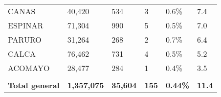 \begin{tabular}{llllll}
	\cellcolor[HTML]{FFFFC7}CANAS         & 40,420             & 534                        & 3                    & 0.6\%                      & 7.4                                                                                   \\
	\cellcolor[HTML]{FFFFC7}ESPINAR       & 71,304             & 990                        & 5                    & 0.5\%                      & 7.0                                                                                   \\
	\cellcolor[HTML]{FFFFC7}PARURO        & 31,264             & 268                        & 2                    & 0.7\%                      & 6.4                                                                                   \\
	\cellcolor[HTML]{FFFFC7}CALCA         & 76,462             & 731                        & 4                    & 0.5\%                      & 5.2                                                                                   \\
	\cellcolor[HTML]{9AFF99}ACOMAYO       & 28,477             & 284                        & 1                    & 0.4\%                      & 3.5                                                                                   \\
	&                    &                            &                      &                            &                                                                                       \\
	\rowcolor[HTML]{ECF4FF} 
	\textbf{Total general}                & \textbf{1,357,075} & \textbf{35,604}            & \textbf{155}         & \textbf{0.44\%}            & \textbf{11.4}                                                                        
\end{tabular}